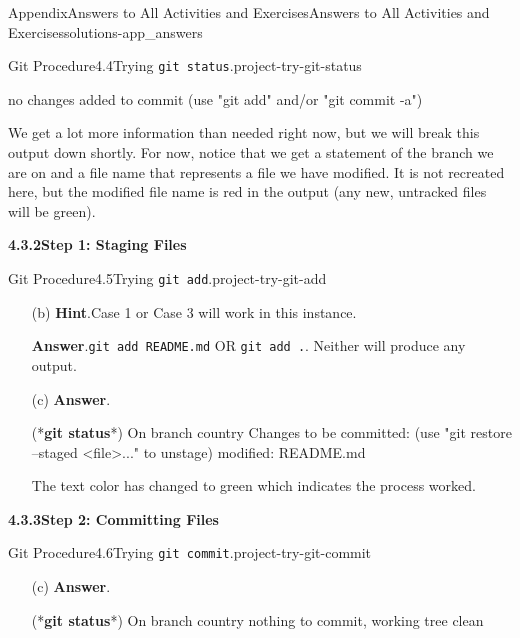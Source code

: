 \documentclass[twoside,10pt,]{book}
\newcommand{\blocktitlefont}{\relax}
\newcommand{\mono}[1]{\texttt{#1}}
\newcommand{\consoleinput}[1]{\textbf{#1}}
\begin{document}
\begin{solutions-chapter}{Appendix}{Answers to All Activities and Exercises}{}{Answers to All Activities and Exercises}{}{}{solutions-app_answers}
\begin{projectsolution}{Git Procedure}{4.4}{Trying \mono{git status}.}{project-try-git-status}
\begin{console}{0}{1}{0}
no changes added to commit (use "git add" and/or "git commit -a")
\end{console}
We get a lot more information than needed right now, but we will break this output down shortly. For now, notice that we get a statement of the branch we are on and a file name that represents a file we have modified. It is not recreated here, but the modified file name is red in the output (any new, untracked files will be green).%
\end{projectsolution}%
\par\medskip
\noindent\textbf{\Large{}4.3.2\space\textperiodcentered\space{}Step 1: Staging Files}
\begin{projectsolution}{Git Procedure}{4.5}{Trying \mono{git add}.}{project-try-git-add}%
\begin{enumerate}[font=\bfseries,label=(\alph*),ref=\alph*]%
\item[(b)]\noindent\textbf{\blocktitlefont Hint}.\hypertarget{hint-try-git-add-d-b-back}{}\quad{}Case 1 or Case 3 will work in this instance.%
\par\smallskip%
\noindent\textbf{\blocktitlefont Answer}.\hypertarget{answer-try-git-add-d-c-back}{}\quad{}\mono{git add README.md} OR \mono{git add .}. Neither will produce any output.%
\item[(c)]\noindent\textbf{\blocktitlefont Answer}.\hypertarget{answer-try-git-add-e-b-back}{}\quad{}\begin{console}{0}{1}{0}
(*\consoleinput{git status}*)
On branch country
Changes to be committed:
  (use "git restore --staged <file>..." to unstage)
        modified:   README.md
\end{console}
The text color has changed to green which indicates the process worked.%
\end{enumerate}%
\end{projectsolution}%
\par\medskip
\noindent\textbf{\Large{}4.3.3\space\textperiodcentered\space{}Step 2: Committing Files}
\begin{projectsolution}{Git Procedure}{4.6}{Trying \mono{git commit}.}{project-try-git-commit}%
\begin{enumerate}[font=\bfseries,label=(\alph*),ref=\alph*]%
\item[(c)]\noindent\textbf{\blocktitlefont Answer}.\hypertarget{answer-try-git-commit-e-b-back}{}\quad{}\begin{console}{0}{1}{0}
(*\consoleinput{git status}*)
On branch country
nothing to commit, working tree clean
\end{console}

\end{enumerate}
\end{projectsolution}
\end{solutions-chapter}
\end{document}
